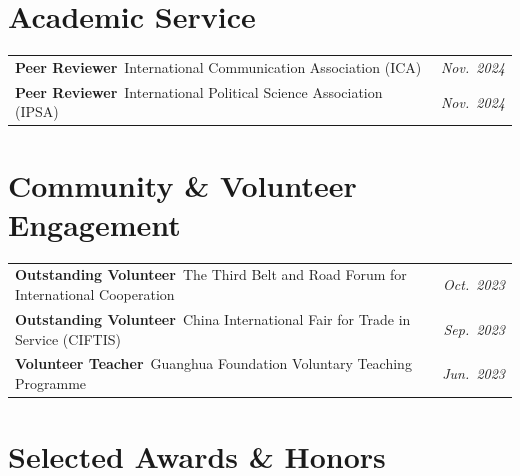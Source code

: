 \documentclass[a4paper,11pt]{article}
\begin{document}
\section{Academic Service}

\noindent\begin{tabularx}{\linewidth}{@{}X r@{}}
  \textbf{Peer Reviewer}\,\,\,{\small\color{muted}International Communication Association (ICA)} & {\small\color{muted}\itshape Nov.\ 2024} \\[3pt]
  \textbf{Peer Reviewer}\,\,\,{\small\color{muted}International Political Science Association (IPSA)} & {\small\color{muted}\itshape Nov.\ 2024} \\
\end{tabularx}

\section{Community \& Volunteer Engagement}

\noindent\begin{tabularx}{\linewidth}{@{}X r@{}}
  \textbf{Outstanding Volunteer}\,\,\,{\small\color{muted}The Third Belt and Road Forum for International Cooperation} & {\small\color{muted}\itshape Oct.\ 2023} \\[3pt]
  \textbf{Outstanding Volunteer}\,\,\,{\small\color{muted}China International Fair for Trade in Service (CIFTIS)} & {\small\color{muted}\itshape Sep.\ 2023} \\[3pt]
  \textbf{Volunteer Teacher}\,\,\,{\small\color{muted}Guanghua Foundation Voluntary Teaching Programme} & {\small\color{muted}\itshape Jun.\ 2023} \\
\end{tabularx}

\section{Selected Awards \& Honors}
\end{document}
